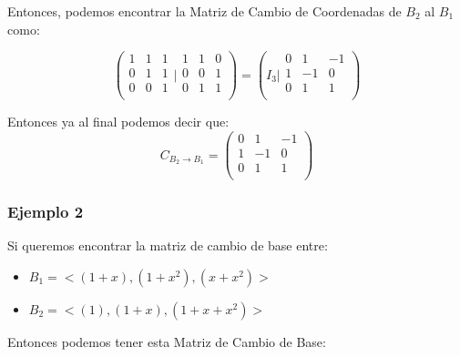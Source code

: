 \documentclass[12pt]{article}							    %
\begin{document}
Entonces, podemos encontrar la Matriz de Cambio de Coordenadas de $B_2$ al $B_1$ como:

\begin{equation*}
    \left(
    \begin{matrix}
        1 & 1 & 1 \\
        0 & 1 & 1 \\
        0 & 0 & 1 \\
    \end{matrix}
    \Big|
    \begin{matrix}
        1 & 1 & 0 \\
        0 & 0 & 1 \\
        0 & 1 & 1 \\
    \end{matrix}
    \right)
    = \left(
    I_3
    \big|
    \begin{matrix}
        0 & 1 & -1 \\
        1 & -1 & 0 \\
        0 & 1 & 1 \\
    \end{matrix}
    \right)
\end{equation*}

Entonces ya al final podemos decir que:
\begin{equation*}
    C_{B_2 \to B_1} =
    \begin{pmatrix}
        0 & 1 & -1 \\
        1 & -1 & 0 \\
        0 & 1 & 1 \\
    \end{pmatrix}
\end{equation*}



\subsubsection{Ejemplo 2}

Si queremos encontrar la matriz de cambio de base entre:
\begin{itemize}
    \item $B_1 = < (1+x), (1+x^2), (x+x^2) >$ 
    \item $B_2 = < (1), (1+x), (1+x+x^2) >$ 
\end{itemize}

Entonces podemos tener esta Matriz de Cambio de Base:
\end{document}
